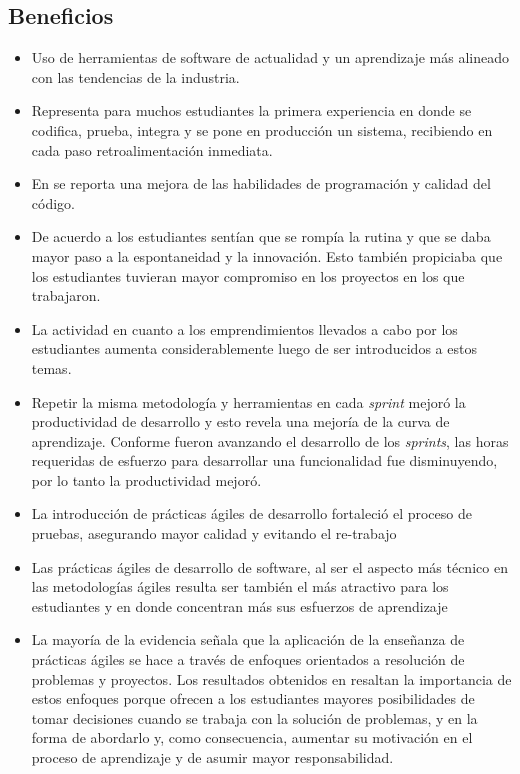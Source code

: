 \subsection{Beneficios}
\begin{itemize}
    \item Uso de herramientas de software de actualidad y un aprendizaje más alineado con las tendencias de la industria\cite{cenfotec-2}.
    \item Representa para muchos estudiantes la primera experiencia en donde se codifica, prueba, integra y se pone en producción un sistema, recibiendo en cada paso retroalimentación inmediata\cite{kropp-meier-2}.
    \item En \cite{kropp-meier-1} se reporta una mejora de las habilidades de programación y calidad del código.
    \item De acuerdo a \cite{scharlau} los estudiantes sentían que se rompía la rutina y que se daba mayor paso a la espontaneidad y la innovación. Esto también propiciaba que los estudiantes tuvieran mayor compromiso en los proyectos en los que trabajaron.
    \item La actividad en cuanto a los emprendimientos llevados a cabo por los estudiantes aumenta considerablemente luego de ser introducidos a estos temas\cite{hickey-salas}.
    \item Repetir la misma metodología y herramientas en cada \emph{sprint} mejoró la productividad de desarrollo y esto revela una mejoría de la curva de aprendizaje. Conforme fueron avanzando el desarrollo de los \emph{sprints}, las horas requeridas de esfuerzo para desarrollar una funcionalidad fue disminuyendo, por lo tanto la productividad mejoró\cite{salazar}.
    \item La introducción de prácticas ágiles de desarrollo fortaleció el proceso de pruebas, asegurando mayor calidad y evitando el re-trabajo\cite{salazar}
    \item Las prácticas ágiles de desarrollo de software, al ser el aspecto más técnico en las metodologías ágiles resulta ser también el más atractivo para los estudiantes y en donde concentran más sus esfuerzos de aprendizaje\cite{steghoger-et-al}
    \item La mayoría de la evidencia señala que la aplicación de la enseñanza de prácticas ágiles se hace a través de enfoques orientados a resolución de problemas y proyectos. Los resultados obtenidos en \cite{mora-et-al-1} resaltan la importancia de estos enfoques porque ofrecen a los estudiantes mayores posibilidades de tomar decisiones cuando se trabaja con la solución de problemas, y en la forma de abordarlo y, como consecuencia, aumentar su motivación en el proceso de aprendizaje y de asumir mayor responsabilidad.

\end{itemize}
